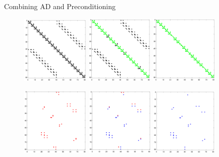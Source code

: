 \documentclass{beamer}
\begin{document}
\begin{frame}{Combining AD and Preconditioning}
\begin{figure}
\centering
\includegraphics[width=0.29\textwidth]{nnz}
\includegraphics[width=0.29\textwidth]{nnz_Ri}
\includegraphics[width=0.29\textwidth]{R_i}
\end{figure}
\begin{figure}
\centering
\includegraphics[width=0.29\textwidth]{P}
\includegraphics[width=0.29\textwidth]{PA}
\includegraphics[width=0.29\textwidth]{add}
\end{figure}
\end{frame}
\end{document}
